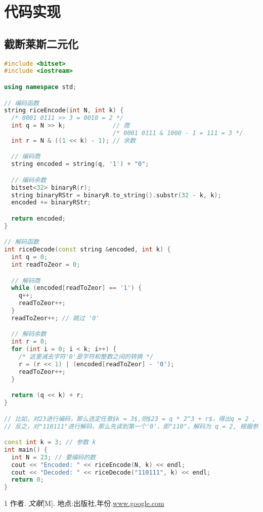 \documentclass{/Users/hi/Study/template/code}
\begin{document}
\newpage
\section{代码实现}
\subsection{截断莱斯二元化}
\begin{lstlisting}[language=c++]
#include <bitset>
#include <iostream>

using namespace std;

// 编码函数
string riceEncode(int N, int k) {
  /* 0001 0111 >> 3 = 0010 = 2 */
  int q = N >> k;             // 商
                              /* 0001 0111 & 1000 - 1 = 111 = 3 */
  int r = N & ((1 << k) - 1); // 余数

  // 编码商
  string encoded = string(q, '1') + "0";

  // 编码余数
  bitset<32> binaryR(r);
  string binaryRStr = binaryR.to_string().substr(32 - k, k);
  encoded += binaryRStr;

  return encoded;
}

// 解码函数
int riceDecode(const string &encoded, int k) {
  int q = 0;
  int readToZeor = 0;

  // 解码商
  while (encoded[readToZeor] == '1') {
    q++;
    readToZeor++;
  }
  readToZeor++; // 跳过 '0'

  // 解码余数
  int r = 0;
  for (int i = 0; i < k; i++) {
    /* 这里减去字符'0'是字符和整数之间的转换 */
    r = (r << 1) | (encoded[readToZeor] - '0');
    readToZeor++;
  }

  return (q << k) + r;
}

// 比如，对23进行编码，那么选定任意$k = 3$,则$23 = q * 2^3 + r$，得出q = 2 , r = 7，则q = "110" , r = "111"，则编码结果为"110111"
// 反之，对"110111"进行解码，那么先读到第一个'0'，即"110"，解码为 q = 2, 根据参数k=3可知，再继续读取3位则为余数r = b'111' = 7, 故$2 * 2^3 + 7 = 23$

const int k = 3; // 参数 k
int main() {
  int N = 23; // 要编码的数
  cout << "Encoded: " << riceEncode(N, k) << endl;
  cout << "Decoded: " << riceDecode("110111", k) << endl;
  return 0;
}
\end{lstlisting}

\newpage
\begin{thebibliography}{1}
	 作者. \emph{文献}[M]. 地点:出版社,年份.\url{www.google.com}
\end{thebibliography}
\end{document}
